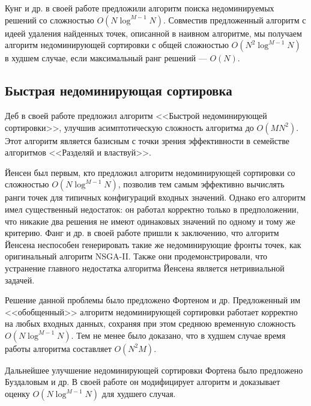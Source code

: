 Кунг и др. в своей работе предложили алгоритм поиска недоминируемых решений со сложностью $O(N\log^{M-1}N)$. Совместив предложенный алгоритм с идеей удаления найденных точек, описанной в наивном алгоритме, мы получаем алгоритм недоминирующей сортировки с общей сложностью $O(N^2\log^{M-1}N)$ в худшем случае, если максимальный ранг решений --- $O(N)$.

\subsection{Быстрая недоминирующая сортировка}
Деб в своей работе предложил алгоритм <<Быстрой недоминирующей сортировки>>, улучшив асимптотическую сложность алгоритма до $O(MN^2)$. Этот алгоритм является базисным с точки зрения эффективности в семействе алгоритмов <<Разделяй и властвуй>>.

Йенсен был первым, кто предложил алгоритм недоминирующей сортировки со сложностью $O(N\log^{M-1}N)$, позволив тем самым эффективно вычислять ранги точек для типичных конфигураций входных значений. Однако его алгоритм имел существенный недостаток: он работал корректно только в предположении, что никакие два решения не имеют одинаковых значений по одному и тому же критерию. Фанг и др. в своей работе пришли к заключению, что алгоритм Йенсена неспособен генерировать такие же недоминирующие фронты точек, как оригинальный алгоритм NSGA-II. Также они продемонстрировали, что устранение главного недостатка алгоритма Йенсена является нетривиальной задачей.

Решение данной проблемы было предложено Фортеном и др. Предложенный им <<обобщенный>> алгоритм недоминирующей сортировки работает корректно на любых входных данных, сохраняя при этом среднюю временную сложность $O(N\log^{M-1}N)$. Тем не менее было доказано, что в худшем случае время работы алгоритма составляет $O(N^2M)$.

Дальнейшее улучшение недоминирующей сортировки Фортена было предложено Буздаловым и др. В своей работе он модифицирует алгоритм и доказывает оценку $O(N\log^{M-1}N)$ для худшего случая.

